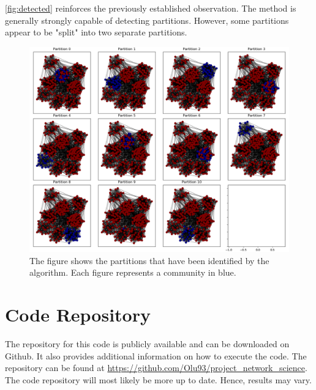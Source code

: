 \documentclass[11pt, twocolumn]{article}
\begin{document}
\autoref{fig:detected} reinforces the previously established observation. The method is generally strongly capable of detecting partitions. However, some partitions appear to be "split" into two separate partitions.

\begin{figure}[htb]
  \includegraphics[width=\linewidth]{detected.png}
  \caption{The figure shows the partitions that have been identified by the algorithm. Each figure represents a community in blue.}
  \label{fig:detected}
\end{figure}



\section{Code Repository}
The repository for this code is publicly available and can be downloaded on Github. It also provides additional information on how to execute the code. The repository can be found at \url{https://github.com/Olu93/project_network_science}. The code repository will most likely be more up to date. Hence, results may vary.

\newpage
\printbibliography
\end{document}
